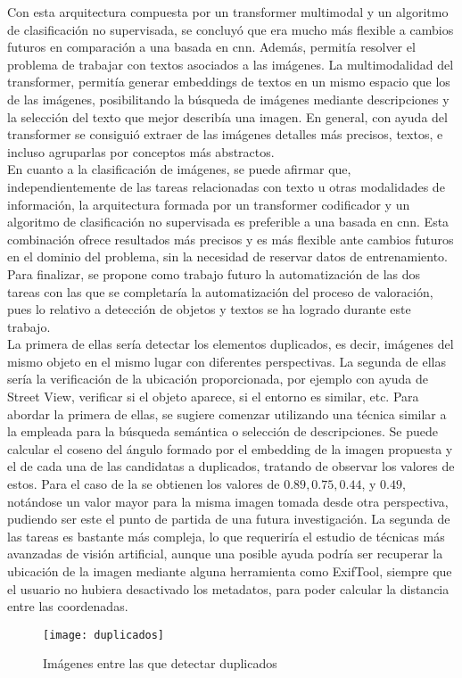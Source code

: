 	Con esta arquitectura compuesta por un transformer multimodal y un algoritmo de clasificación no supervisada, se concluyó que era mucho más flexible a cambios futuros en comparación a una basada en \gls{cnn}. Además, permitía resolver el problema de trabajar con textos asociados a las imágenes. La multimodalidad del transformer, permitía generar embeddings de textos en un mismo espacio que los de las imágenes, posibilitando la búsqueda de imágenes mediante descripciones y la selección del texto que mejor describía una imagen. En general, con ayuda del transformer se consiguió extraer de las imágenes detalles más precisos, textos, e incluso agruparlas por conceptos más abstractos. \\
	
	En cuanto a la clasificación de imágenes, se puede afirmar que, independientemente de las tareas relacionadas con texto u otras modalidades de información, la arquitectura formada por un transformer codificador y un algoritmo de clasificación no supervisada es preferible a una basada en \gls{cnn}. Esta combinación ofrece resultados más precisos y es más flexible ante cambios futuros en el dominio del problema, sin la necesidad de reservar datos de entrenamiento. Para finalizar, se propone como trabajo futuro la automatización de las dos tareas con las que se completaría la automatización del proceso de valoración, pues lo relativo a detección de objetos y textos se ha logrado durante este trabajo. \\
	
	La primera de ellas sería detectar los elementos duplicados, es decir, imágenes del mismo objeto en el mismo lugar con diferentes perspectivas. La segunda de ellas sería la verificación de la ubicación proporcionada, por ejemplo  con ayuda de Street View, verificar si el objeto aparece, si el entorno es similar, etc. Para abordar la primera de ellas, se sugiere comenzar utilizando una técnica similar a la empleada para la búsqueda semántica o selección de descripciones. Se puede calcular el coseno del ángulo formado por el embedding de la imagen propuesta y el de cada una de las candidatas a duplicados, tratando de observar los valores de estos. Para el caso de la  se obtienen los valores de $0.89, 0.75, 0.44$, y $0.49$, notándose un valor mayor para la misma imagen tomada desde otra perspectiva, pudiendo ser este el punto de partida de una futura investigación. La segunda de las tareas es bastante más compleja, lo que requeriría el estudio de técnicas más avanzadas de visión artificial, aunque una posible ayuda podría ser recuperar la ubicación de la imagen mediante alguna herramienta como ExifTool, siempre que el usuario no hubiera desactivado los metadatos, para poder calcular la distancia entre las coordenadas. 
	
	\begin{figure}[!h]
		\centering
		\texttt{[image: duplicados]}
		\caption{Imágenes entre las que detectar duplicados}
		\label{fig:duplicados}
	\end{figure}